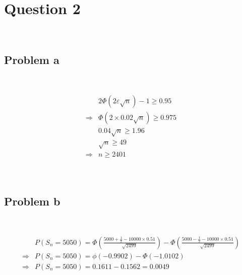 \documentclass{article}
\begin{document}
\newpage

\section*{Question 2}

~

\subsection*{Problem a}

~

\begin{equation*}
    \begin{split}
        &2\Phi(2\varepsilon\sqrt{n})-1\geqslant0.95\\
        \Rightarrow&\Phi(2\times0.02\sqrt{n})\geqslant0.975\\
        &0.04\sqrt{n}\geqslant1.96\\
        &\sqrt{n}\geqslant49\\
        \Rightarrow&n\geqslant2401\\
    \end{split}
\end{equation*}

~

\subsection*{Problem b}

~

\begin{equation*}
    \begin{split}
        &P(S_n=5050)=\Phi(\frac{5000+\frac{1}{2}-10000\times0.51}{\sqrt{2499}})-\Phi(\frac{5000-\frac{1}{2}-10000\times0.51}{\sqrt{2499}})\\
        \Rightarrow&P(S_n=5050)=\phi(-0.9902)-\Phi(-1.0102)\\
        \Rightarrow&P(S_n=5050)=0.1611-0.1562=0.0049\\
    \end{split}
\end{equation*}
\end{document}
